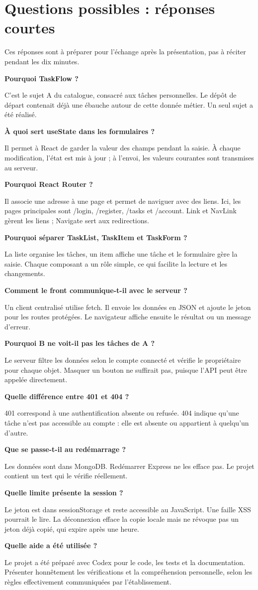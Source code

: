 \documentclass[11pt,a4paper]{article}
\newcommand{\question}[2]{\par\textbf{#1}\par #2\par}
\begin{document}
\newpage
\section*{Questions possibles : réponses courtes}
Ces réponses sont à préparer pour l'échange après la présentation, pas à réciter pendant les dix minutes.

\question{Pourquoi TaskFlow ?}{C'est le sujet A du catalogue, consacré aux tâches personnelles. Le dépôt de départ contenait déjà une ébauche autour de cette donnée métier. Un seul sujet a été réalisé.}
\question{À quoi sert useState dans les formulaires ?}{Il permet à React de garder la valeur des champs pendant la saisie. À chaque modification, l'état est mis à jour ; à l'envoi, les valeurs courantes sont transmises au serveur.}
\question{Pourquoi React Router ?}{Il associe une adresse à une page et permet de naviguer avec des liens. Ici, les pages principales sont /login, /register, /tasks et /account. Link et NavLink gèrent les liens ; Navigate sert aux redirections.}
\question{Pourquoi séparer TaskList, TaskItem et TaskForm ?}{La liste organise les tâches, un item affiche une tâche et le formulaire gère la saisie. Chaque composant a un rôle simple, ce qui facilite la lecture et les changements.}
\question{Comment le front communique-t-il avec le serveur ?}{Un client centralisé utilise fetch. Il envoie les données en JSON et ajoute le jeton pour les routes protégées. Le navigateur affiche ensuite le résultat ou un message d'erreur.}
\question{Pourquoi B ne voit-il pas les tâches de A ?}{Le serveur filtre les données selon le compte connecté et vérifie le propriétaire pour chaque objet. Masquer un bouton ne suffirait pas, puisque l'API peut être appelée directement.}
\question{Quelle différence entre 401 et 404 ?}{401 correspond à une authentification absente ou refusée. 404 indique qu'une tâche n'est pas accessible au compte : elle est absente ou appartient à quelqu'un d'autre.}
\question{Que se passe-t-il au redémarrage ?}{Les données sont dans MongoDB. Redémarrer Express ne les efface pas. Le projet contient un test qui le vérifie réellement.}
\question{Quelle limite présente la session ?}{Le jeton est dans sessionStorage et reste accessible au JavaScript. Une faille XSS pourrait le lire. La déconnexion efface la copie locale mais ne révoque pas un jeton déjà copié, qui expire après une heure.}
\question{Quelle aide a été utilisée ?}{Le projet a été préparé avec Codex pour le code, les tests et la documentation. Présenter honnêtement les vérifications et la compréhension personnelle, selon les règles effectivement communiquées par l'établissement.}
\end{document}
